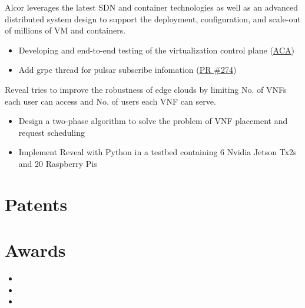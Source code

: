 \documentclass{resume}
\begin{document}
Alcor leverages the latest SDN and container technologies as well as an advanced distributed system design to support the deployment, configuration, and scale-out of millions of VM and containers.
\begin{itemize}
  \item Developing and end-to-end testing of the virtualization control plane (\href{https://github.com/futurewei-cloud/alcor-control-agent}{ACA})
  \item Add grpc thread for pulsar subscribe infomation (\href{https://github.com/futurewei-cloud/alcor-control-agent/pull/274}{PR \#274})
\end{itemize}

Reveal tries to improve the robustness of edge clouds by limiting No. of VNFs each user can access and No. of users each VNF can serve.
\begin{itemize}
  \item Design a two-phase algorithm to solve the problem of VNF placement and request scheduling
  \item Implement Reveal with Python in a testbed containing 6 Nvidia Jetson Tx2s and 20 Raspberry Pis
\end{itemize}

\section{Patents}



\section{Awards}
\begin{itemize}[parsep=0.5ex]
  \item {}
  \item {}
  \item {}
\end{itemize}

\end{document}
